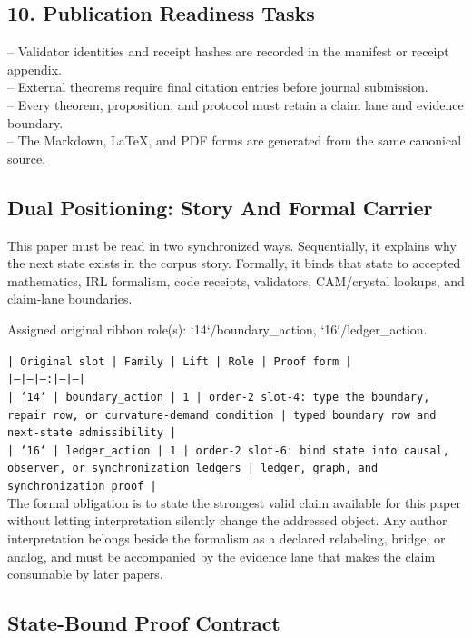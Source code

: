 \documentclass[11pt]{article}
\begin{document}
\subsection*{10. Publication Readiness Tasks}

\noindent{}-- Validator identities and receipt hashes are recorded in the manifest or receipt appendix.\\
\noindent{}-- External theorems require final citation entries before journal submission.\\
\noindent{}-- Every theorem, proposition, and protocol must retain a claim lane and evidence boundary.\\
\noindent{}-- The Markdown, LaTeX, and PDF forms are generated from the same canonical source.\\

\subsection*{Dual Positioning: Story And Formal Carrier}

This paper must be read in two synchronized ways. Sequentially, it explains why
the next state exists in the corpus story. Formally, it binds that state to
accepted mathematics, IRL formalism, code receipts, validators, CAM/crystal
lookups, and claim-lane boundaries.

Assigned original ribbon role(s): `14`/boundary\_action, `16`/ledger\_action.

\noindent\texttt{| Original slot | Family | Lift | Role | Proof form |}\\
\noindent\texttt{|---|---|---:|---|---|}\\
\noindent\texttt{| `14` | boundary\_action | 1 | order-2 slot-4: type the boundary, repair row, or curvature-demand condition | typed boundary row and next-state admissibility |}\\
\noindent\texttt{| `16` | ledger\_action | 1 | order-2 slot-6: bind state into causal, observer, or synchronization ledgers | ledger, graph, and synchronization proof |}\\

The formal obligation is to state the strongest valid claim available for this
paper without letting interpretation silently change the addressed object. Any
author interpretation belongs beside the formalism as a declared relabeling,
bridge, or analog, and must be accompanied by the evidence lane that makes the
claim consumable by later papers.

\subsection*{State-Bound Proof Contract}
\end{document}
